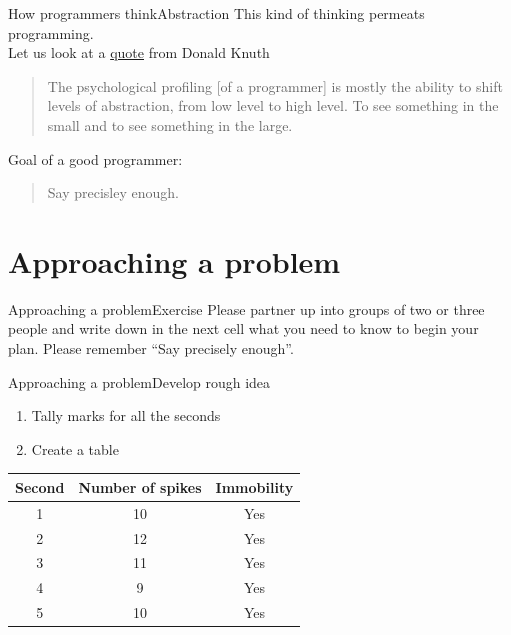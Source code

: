 \documentclass[aspectratio=169]{beamer}
\begin{document}
\begin{frame}{How programmers think}{Abstraction}
This kind of thinking permeats programming. \\

Let us look at a \href{https://en.wikiquote.org/wiki/Donald_Knuth}{quote} from Donald Knuth

\begin{quote}
The psychological profiling [of a programmer] is mostly the ability to shift levels of abstraction,
from low level to high level.
To see something in the small and to see something in the large.
\end{quote}

\pause

Goal of a good programmer:
\begin{quote}
	\centering
	Say precisley enough.
\end{quote}
\end{frame}

\section{Approaching a problem}
\begin{frame}{Approaching a problem}{Exercise}
Please partner up into groups of two or three people and write down in the next cell
what you need to know to begin your plan.
Please remember “Say precisely enough”.
\end{frame}

\begin{frame}{Approaching a problem}{Develop rough idea}
\begin{enumerate}
	\item Tally marks for all the seconds
	\item Create a table
\end{enumerate}

\begin{table}[h]
\center
\begin{tabular}{ccc}
\toprule
Second & Number of spikes & Immobility \\
\midrule
1 & 10 & Yes \\
2 & 12 & Yes \\
3 & 11 & Yes \\
4 & 9 & Yes \\
5 & 10 & Yes \\
\bottomrule
\end{tabular}
\end{table}
\end{frame}
\end{document}
